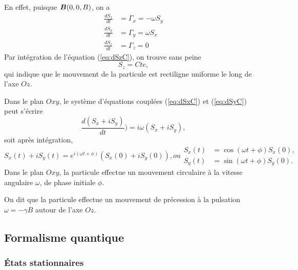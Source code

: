 En effet, puisque $\boldsymbol{B}(0,0,B)$, on a
\begin{subequations}
 \begin{align}
  \frac{dS_{x}}{dt} & =\Gamma_{x}=-\omega S_{y}\label{eq:dSxC}\\
  \frac{dS_{y}}{dt} & =\Gamma_{y}=\omega S_{x}\label{eq:dSyC}\\
  \frac{dS_z}{dt} & =\Gamma_z=0 \label{eq:dSzC}
 \end{align}
\end{subequations}
Par intégration de l'équation (\ref{eq:dSzC}), on trouve sans peine
\begin{equation}
 S_z=Cte,
\end{equation}
qui indique que le mouvement de la particule est rectiligne uniforme le long de
l'axe $Oz$.

Dans le plan $Oxy$, le système d'équations couplées (\ref{eq:dSxC}) et
(\ref{eq:dSyC}) peut s'écrire
\begin{equation}
 \frac{d(S_{x}+iS_{y})}{dt})=i\omega(S_{x}+iS_{y}),
\end{equation}
soit après intégration,
\begin{subequations}
\begin{equation}
 S_{x}(t)+iS_{y}(t)=e^{i(\omega t +\phi)}(S_{x}(0)+iS_{y}(0)),
\end{equation}
ou
\begin{align}
 S_{x}(t) &=\cos(\omega t +\phi)S_{x}(0),\\
 S_{y}(t)&=\sin(\omega t +\phi)S_{y}(0).
\end{align}

\end{subequations}
Dans le plan $Oxy$, la particule effectue un mouvement circulaire à la vitesse
angulaire $\omega$, de phase initiale $\phi$.

On dit que la particule effectue un mouvement de précession à la pulsation
$\omega=-\gamma B$ autour de l'axe $Oz$.

\subsection{Formalisme quantique}

\subsubsection{États stationnaires}

